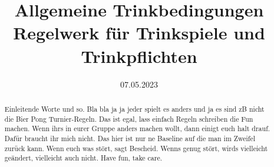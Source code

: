 \documentclass{report}
\title{\Huge Allgemeine Trinkbedingungen \\[2ex] \Large Regelwerk für Trinkspiele und Trinkpflichten}
\date{07.05.2023}
\begin{document}


\maketitle
\begin{abstract}
	Einleitende Worte und so.
	Bla bla ja ja jeder spielt es anders und ja es sind zB nicht die Bier Pong Turnier-Regeln.
	Das ist egal, lass einfach Regeln schreiben die Fun machen.
	Wenn ihrs in eurer Gruppe anders machen wollt, dann einigt euch halt drauf.
	Dafür braucht ihr mich nicht.
	Das hier ist nur ne Baseline auf die man im Zweifel zurück kann.
	Wenn euch was stört, sagt Bescheid.
	Wenns genug stört, wirds vielleicht geändert, vielleicht auch nicht.
	Have fun, take care.
\end{abstract}
\tableofcontents
\cleardoublepage
{}











\end{document}
